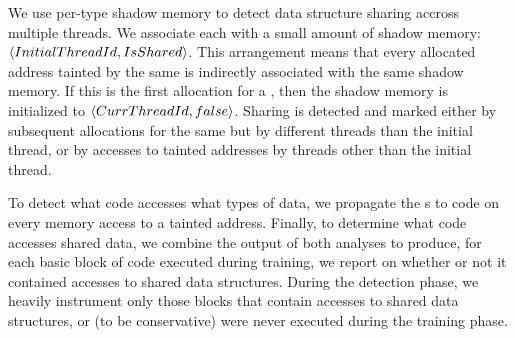 \documentclass[letterpaper,twocolumn,10pt]{article}
\newcommand{\TextToolname}{Malcontent}
\newcommand{\Toolname}{\textsc{\TextToolname{}}}
\begin{document}
We use per-type shadow memory to detect data structure sharing accross multiple threads.
We associate each \TypeId{} with a small amount of shadow memory: $\langle InitialThreadId,\linebreak[0]IsShared \rangle$. This
arrangement means that every allocated address tainted by the same \TypeId{} is indirectly associated with the same
shadow memory. If this is the first allocation for a \TypeId, then the shadow memory is initialized to
$\langle CurrThreadId,\linebreak[0]false \rangle$. Sharing is detected and marked either by subsequent allocations for the
same \TypeId{} but by different threads than the initial thread, or by accesses to tainted addresses by threads other
than the initial thread.

To detect what code accesses what types of data, we propagate the {\TypeId}s to code on every memory access to
a tainted address. Finally, to determine what code accesses shared data, we combine the output of both analyses to
produce, for each basic block of code executed during training, we report on whether or not it contained accesses
to shared data structures. During the detection phase, we heavily instrument only those blocks that contain accesses
to shared data structures, or (to be conservative) were never executed during the training phase.

%
%
\end{document}
